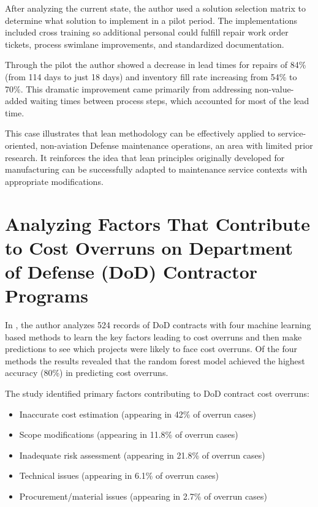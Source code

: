\documentclass{article}
\begin{document}
			After analyzing the current state, the author used a solution selection matrix to determine what solution to implement in a pilot period.
			The implementations included cross training so additional personal could fulfill repair work order tickets, process swimlane improvements, and standardized documentation.
 
			Through the pilot the author showed a decrease in lead times for repairs of 84\% (from 114 days to just 18 days) and inventory fill rate increasing from 54\% to 70\%. 
			This dramatic improvement came primarily from addressing non-value-added waiting times between process steps, which accounted for most of the lead time.

			This case illustrates that lean methodology can be effectively applied to service-oriented, non-aviation Defense maintenance operations, an area with limited prior research. 
			It reinforces the idea that lean principles originally developed for manufacturing can be successfully adapted to maintenance service contexts with appropriate modifications.


		\section{Analyzing Factors That Contribute to Cost Overruns on Department of Defense (DoD) Contractor Programs \cite{FunchesAllen2025}}

			In \cite{FunchesAllen2025}, the author analyzes 524 records of DoD contracts with four machine learning based methods to learn the key factors leading to cost overruns and then make predictions to see which projects were likely to face cost overruns.
			Of the four methods the results revealed that the random forest model achieved the highest accuracy (80\%) in predicting cost overruns. 

			The study identified primary factors contributing to DoD contract cost overruns:

			\begin{itemize}
				\item Inaccurate cost estimation (appearing in 42\% of overrun cases)
				\item Scope modifications (appearing in 11.8\% of overrun cases)
				\item Inadequate risk assessment (appearing in 21.8\% of overrun cases)
				\item Technical issues (appearing in 6.1\% of overrun cases)
				\item Procurement/material issues (appearing in 2.7\% of overrun cases)
			\end{itemize}
\end{document}
